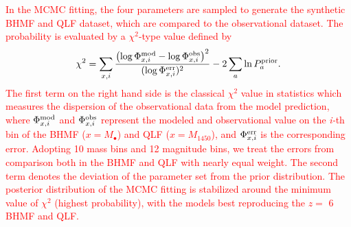 \documentclass[twocolumn, twocolappendix]{aastex63}
\newcommand{\Mbh}{M_\bullet}
\newcommand{\Muv}{M_{1450}}
\newcommand{\red}[1]{\textcolor{red}{ #1}}
\begin{document}
\begin{CJK*}{UTF8}{gbsn}
\red{
In the MCMC fitting, the four parameters are sampled to generate the synthetic BHMF and QLF dataset,
which are compared to the observational dataset. 
The probability is evaluated by a $\chi^2$-type value defined by
%
\begin{align}
  \chi^2 = \sum_{x,i}
  \frac{\left(\log{\Phi^{\rm mod}_{x,i}} - \log{\Phi^{\rm obs}_{x,i}}\right)^2}{(\log{\Phi^{\rm err}_{x,i}})^2}
  - 2 \sum_{a} \ln P^{\rm prior}_a.
\end{align}
%
The first term on the right hand side is the classical $\chi^2$ value in statistics which measures the dispersion of the observational data from the model prediction,
where $\Phi^{\rm mod}_{x,i}$ and $\Phi^{\rm obs}_{x,i}$ represent the modeled and observational value 
on the \textit{i-}th bin of the BHMF ($x=\Mbh$) and QLF ($x=\Muv$), and $\Phi^{\rm err}_{x,i}$ is the corresponding error.
Adopting 10 mass bins and 12 magnitude bins, we treat the errors from comparison both in the BHMF and QLF
with nearly equal weight.
The second term denotes the deviation of the parameter set from the prior distribution.
The posterior distribution of the MCMC fitting is stabilized around the minimum value of $\chi^2$ (highest probability), 
with the models best reproducing the $z=$ 6 BHMF and QLF.
}



\vspace{2mm}

\end{CJK*}
\end{document}
